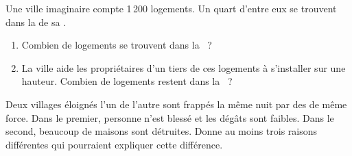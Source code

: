 \begin{exercise}[$\star\star$]\label{exo:g5:natural-hazards:10}
Une ville imaginaire compte 1\,200 logements. Un quart d'entre eux se
trouvent dans la  de sa .
\begin{enumerate}
  \item[(a)] Combien de logements se trouvent dans la ~?
  \item[(b)] La ville aide les propriétaires d'un tiers de ces logements à
        s'installer sur une hauteur. Combien de logements restent dans la ~?
\end{enumerate}
\end{exercise}

\begin{exercise}[$\star\star\star$]\label{exo:g5:natural-hazards:11}
Deux villages éloignés l'un de l'autre sont frappés la même nuit par des
 de même force. Dans le premier, personne n'est blessé et les
dégâts sont faibles. Dans le second, beaucoup de maisons sont détruites.
Donne au moins trois raisons différentes qui pourraient expliquer cette
différence.
\end{exercise}
